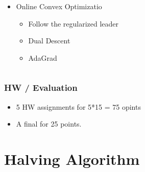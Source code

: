 \documentclass{beamer}
\begin{document}
\begin{small}
\begin{frame}
\begin{columns}
\begin{column}[t]{4cm}
\begin{itemize}
    \item Online Convex Optimizatio
      \begin{itemize}
      \item Follow the regularized leader
      \item Dual Descent
      \item AdaGrad
      \end{itemize}
    \end{itemize}
  \end{column}
\end{columns}
\iffalse
    1.Introduction			15.Specialists			7.Bregman			Untitled.ipynb
10.DualDescent			2.Hedge				8.tracking			XX.OCO
11.DriftingGames		3.UniversalCodingBayes		9.trackingASmallSetOfExpert	macros.tex
12.RepeatedMatrix		4.ContinExperts			HW				plan.md
13.InternalRegret		5.ContextAlg					texput.log
14.MultipleArmBandit		6.mixable		
\fi
  \end{frame}
\end{small}

  \begin{frame}
    \frametitle{HW /  Evaluation}
    \begin{itemize}
    \item 5 HW assignments for 5*15 = 75 opints
      \item A final for 25 points.
      \end{itemize}
  \end{frame}

\section{Halving Algorithm}
\end{document}
